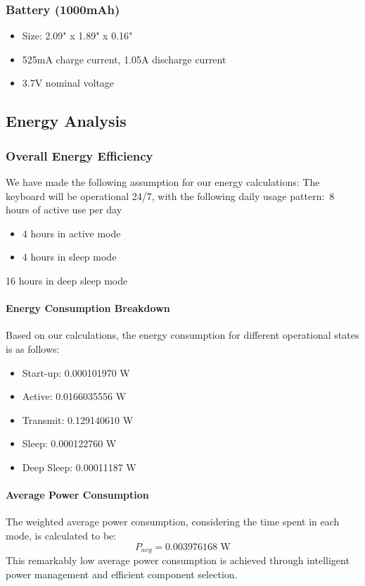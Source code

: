 \documentclass[a4paper,11pt]{article}%
\begin{document}
\subsubsection{Battery (1000mAh)}
\begin{itemize}
    \item Size: 2.09" x 1.89" x 0.16"
    \item 525mA charge current, 1.05A discharge current
    \item 3.7V nominal voltage
\end{itemize}


\subsection{Energy Analysis}
\subsubsection{Overall Energy Efficiency}
We have made the following assumption for our energy calculations:
The keyboard will be operational 24/7, with the following daily usage pattern:\
8 hours of active use per day
\begin{itemize}
\item 4 hours in active mode
\item 4 hours in sleep mode
\end{itemize}
16 hours in deep sleep mode
\paragraph{Energy Consumption Breakdown}
Based on our calculations, the energy consumption for different operational states is as follows:
\begin{itemize}
\item Start-up: 0.000101970 W
\item Active: 0.0166035556 W
\item Transmit: 0.129140610 W
\item Sleep: 0.000122760 W
\item Deep Sleep: 0.00011187 W
\end{itemize}
\paragraph{Average Power Consumption}
The weighted average power consumption, considering the time spent in each mode, is calculated to be:
\begin{equation}
P_{avg} = 0.003976168 \text{ W}
\end{equation}
This remarkably low average power consumption is achieved through intelligent power management and efficient component selection.
\end{document}
